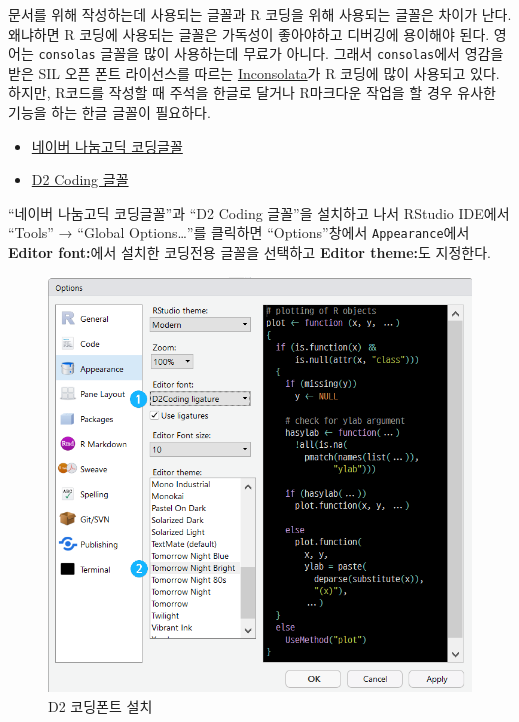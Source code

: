 \documentclass[
]{book}
\providecommand{\tightlist}{%
  \setlength{\itemsep}{0pt}\setlength{\parskip}{0pt}}
\begin{document}
문서를 위해 작성하는데 사용되는 글꼴과 R 코딩을 위해 사용되는 글꼴은
차이가 난다. 왜냐하면 R 코딩에 사용되는 글꼴은 가독성이 좋아야하고
디버깅에 용이해야 된다. 영어는 \texttt{consolas} 글꼴을 많이 사용하는데 무료가
아니다. 그래서 \texttt{consolas}에서 영감을 받은 SIL 오픈 폰트 라이선스를
따르는 \href{https://en.wikipedia.org/wiki/Inconsolata}{Inconsolata}가 R
코딩에 많이 사용되고 있다. 하지만, R코드를 작성할 때 주석을 한글로
달거나 R마크다운 작업을 할 경우 유사한 기능을 하는 한글 글꼴이 필요하다.

\begin{itemize}
\tightlist
\item
  \href{https://github.com/naver/nanumfont/blob/master/README.md}{네이버 나눔고딕 코딩글꼴}
\item
  \href{https://github.com/naver/d2codingfont}{D2 Coding 글꼴}
\end{itemize}

``네이버 나눔고딕 코딩글꼴''과 ``D2 Coding 글꼴''을 설치하고 나서 RStudio
IDE에서 ``Tools'' → ``Global Options\ldots{}''를 클릭하면 ``Options''창에서
\texttt{Appearance}에서 \textbf{Editor font:}에서 설치한 코딩전용 글꼴을 선택하고
\textbf{Editor theme:}도 지정한다.

\begin{figure}
\centering
\includegraphics[width=1\textwidth,height=\textheight]{assets/images/font_d2coding.png}
\caption{D2 코딩폰트 설치}
\end{figure}
\end{document}

